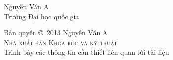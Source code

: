 \newpage

\noindent Nguyễn Văn A\\
\noindent Trường Đại học quốc gia

\vfill

\noindent Bản quyền \copyright\ 2013 Nguyễn Văn A\\ %
\noindent \textsc{Nhà xuất bản Khoa học và kỹ thuật}\\ %
\noindent Trình bày các thông tin cần thiết liên quan tới tài liệu

